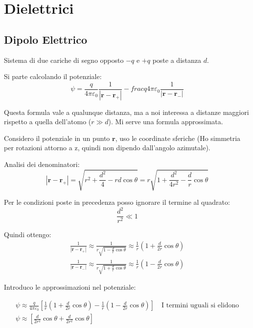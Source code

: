 \documentclass[a4paper]{scrarticle}
\begin{document}
\section {Dielettrici}

\subsection{Dipolo Elettrico}

Sistema di due cariche di segno opposto $-q$ e $+q$ poste a distanza $d$.

Si parte calcolando il potenziale:
\begin{equation*}
    \psi = \frac{q}{4\pi\varepsilon_0} \frac{1}{\left|\bm r - \bm r_+\right|} - frac{q}{4\pi\varepsilon_0} \frac{1}{\left|\bm r - \bm r_-\right|}
\end{equation*}

Questa formula vale a qualunque distanza, ma a noi interessa a distanze maggiori rispetto a quella dell'atomo ($r \gg d$). Mi serve una formula approssimata.

Considero il potenziale in un punto $\bm r$, uso le coordinate sferiche (Ho simmetria per rotazioni attorno a z, quindi non dipendo dall'angolo azimutale).

Analisi dei denominatori:
\begin{equation*}
    \left|\bm r - \bm r_+\right|= \sqrt{r^2 + \frac{d^2}{4} - rd \cos \theta} = r \sqrt{1 + \frac{d^2}{4r^2} - \frac{d}{r}\cos \theta}
\end{equation*}

Per le condizioni poste in precedenza posso ignorare il termine al quadrato:
\begin{equation*}
    \frac{d^2}{r^2} \ll 1
\end{equation*}

Quindi ottengo:
\begin{gather}
    \frac{1}{\left|\bm r - \bm r_+\right|} \approx \frac{1}{r \sqrt{1 - \frac{d}{r}\cos \theta}} \approx \frac{1}{r}(1 + \frac{d}{2r}\cos \theta)\\
    \frac{1}{\left|\bm r - \bm r_-\right|} \approx \frac{1}{r \sqrt{1 + \frac{d}{r}\cos \theta}} \approx \frac{1}{r}(1 - \frac{d}{2r}\cos \theta)
\end{gather}

Introduco le approssimazioni nel potenziale:

\begin{gather*}
    \psi \approx \frac{q}{4\pi\varepsilon_0}\left[\frac{1}{r}(1 + \frac{d}{2r}\cos \theta) - \frac{1}{r}(1 - \frac{d}{2r}\cos \theta)\right] \quad \text{I termini uguali si elidono}\\
    \psi \approx \left[\frac{d}{2r^2}\cos \theta + \frac{d}{2r^2}\cos \theta\right]
\end{gather*}
\end{document}
